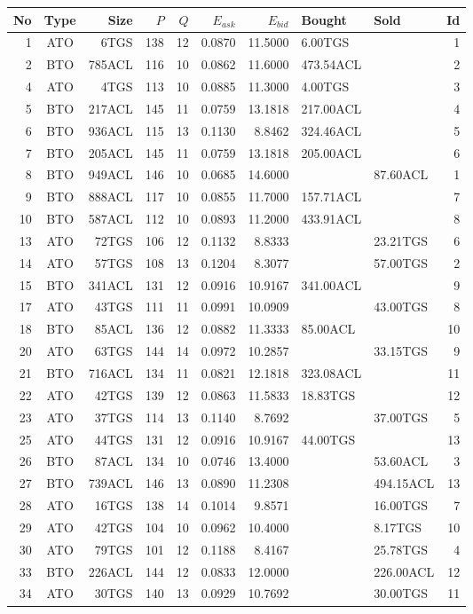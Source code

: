 \begin{tabular}{|r|c|r|r|r|r|r|p{2cm}|p{2cm}|r|}
\hline

No & Type & Size & $P$ & $Q$ & $E_{ask}$ & $E_{bid}$ & Bought & Sold & Id \\
\hline
1 & ATO & 6TGS & 138 & 12 & 0.0870 & 11.5000 & 6.00TGS &    & 1 \\
\hline
2 & BTO & 785ACL & 116 & 10 & 0.0862 & 11.6000 & 473.54ACL &    & 2 \\
\hline
4 & ATO & 4TGS & 113 & 10 & 0.0885 & 11.3000 & 4.00TGS &    & 3 \\
\hline
5 & BTO & 217ACL & 145 & 11 & 0.0759 & 13.1818 & 217.00ACL &    & 4 \\
\hline
6 & BTO & 936ACL & 115 & 13 & 0.1130 & 8.8462 & 324.46ACL &    & 5 \\
\hline
7 & BTO & 205ACL & 145 & 11 & 0.0759 & 13.1818 & 205.00ACL &    & 6 \\
\hline
8 & BTO & 949ACL & 146 & 10 & 0.0685 & 14.6000 &    & 87.60ACL & 1 \\
\hline
9 & BTO & 888ACL & 117 & 10 & 0.0855 & 11.7000 & 157.71ACL &    & 7 \\
\hline
10 & BTO & 587ACL & 112 & 10 & 0.0893 & 11.2000 & 433.91ACL &    & 8 \\
\hline
13 & ATO & 72TGS & 106 & 12 & 0.1132 & 8.8333 &    & 23.21TGS & 6 \\
\hline
14 & ATO & 57TGS & 108 & 13 & 0.1204 & 8.3077 &    & 57.00TGS & 2 \\
\hline
15 & BTO & 341ACL & 131 & 12 & 0.0916 & 10.9167 & 341.00ACL &    & 9 \\
\hline
17 & ATO & 43TGS & 111 & 11 & 0.0991 & 10.0909 &    & 43.00TGS & 8 \\
\hline
18 & BTO & 85ACL & 136 & 12 & 0.0882 & 11.3333 & 85.00ACL &    & 10 \\
\hline
20 & ATO & 63TGS & 144 & 14 & 0.0972 & 10.2857 &    & 33.15TGS & 9 \\
\hline
21 & BTO & 716ACL & 134 & 11 & 0.0821 & 12.1818 & 323.08ACL &    & 11 \\
\hline
22 & ATO & 42TGS & 139 & 12 & 0.0863 & 11.5833 & 18.83TGS &    & 12 \\
\hline
23 & ATO & 37TGS & 114 & 13 & 0.1140 & 8.7692 &    & 37.00TGS & 5 \\
\hline
25 & ATO & 44TGS & 131 & 12 & 0.0916 & 10.9167 & 44.00TGS &    & 13 \\
\hline
26 & BTO & 87ACL & 134 & 10 & 0.0746 & 13.4000 &    & 53.60ACL & 3 \\
\hline
27 & BTO & 739ACL & 146 & 13 & 0.0890 & 11.2308 &    & 494.15ACL & 13 \\
\hline
28 & ATO & 16TGS & 138 & 14 & 0.1014 & 9.8571 &    & 16.00TGS & 7 \\
\hline
29 & ATO & 42TGS & 104 & 10 & 0.0962 & 10.4000 &    & 8.17TGS & 10 \\
\hline
30 & ATO & 79TGS & 101 & 12 & 0.1188 & 8.4167 &    & 25.78TGS & 4 \\
\hline
33 & BTO & 226ACL & 144 & 12 & 0.0833 & 12.0000 &    & 226.00ACL & 12 \\
\hline
34 & ATO & 30TGS & 140 & 13 & 0.0929 & 10.7692 &    & 30.00TGS & 11 \\
\hline
\end{tabular}
